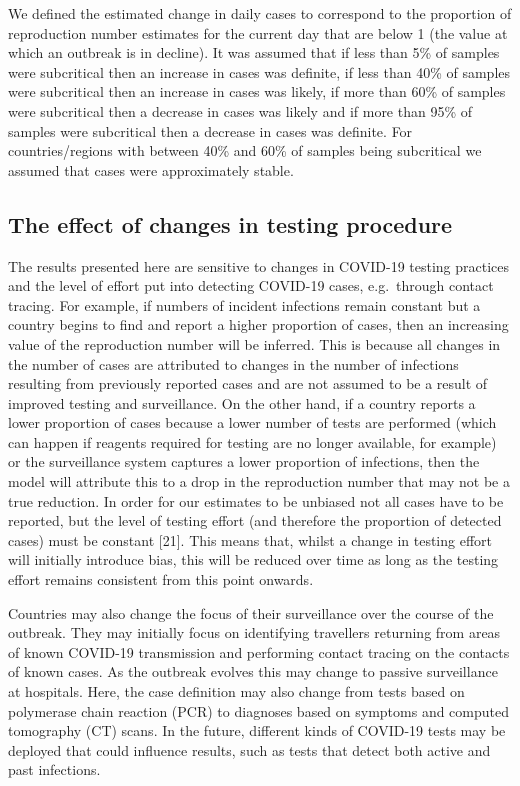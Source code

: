 \documentclass[
]{article}
\begin{document}
We defined the estimated change in daily cases to correspond to the
proportion of reproduction number estimates for the current day that are
below 1 (the value at which an outbreak is in decline). It was assumed
that if less than 5\% of samples were subcritical then an increase in
cases was definite, if less than 40\% of samples were subcritical then
an increase in cases was likely, if more than 60\% of samples were
subcritical then a decrease in cases was likely and if more than 95\% of
samples were subcritical then a decrease in cases was definite. For
countries/regions with between 40\% and 60\% of samples being
subcritical we assumed that cases were approximately stable.

\hypertarget{the-effect-of-changes-in-testing-procedure}{%
\subsection{The effect of changes in testing
procedure}\label{the-effect-of-changes-in-testing-procedure}}

The results presented here are sensitive to changes in COVID-19 testing
practices and the level of effort put into detecting COVID-19 cases,
e.g.~through contact tracing. For example, if numbers of incident
infections remain constant but a country begins to find and report a
higher proportion of cases, then an increasing value of the reproduction
number will be inferred. This is because all changes in the number of
cases are attributed to changes in the number of infections resulting
from previously reported cases and are not assumed to be a result of
improved testing and surveillance. On the other hand, if a country
reports a lower proportion of cases because a lower number of tests are
performed (which can happen if reagents required for testing are no
longer available, for example) or the surveillance system captures a
lower proportion of infections, then the model will attribute this to a
drop in the reproduction number that may not be a true reduction. In
order for our estimates to be unbiased not all cases have to be
reported, but the level of testing effort (and therefore the proportion
of detected cases) must be constant {[}21{]}. This means that, whilst a
change in testing effort will initially introduce bias, this will be
reduced over time as long as the testing effort remains consistent from
this point onwards.

Countries may also change the focus of their surveillance over the
course of the outbreak. They may initially focus on identifying
travellers returning from areas of known COVID-19 transmission and
performing contact tracing on the contacts of known cases. As the
outbreak evolves this may change to passive surveillance at hospitals.
Here, the case definition may also change from tests based on polymerase
chain reaction (PCR) to diagnoses based on symptoms and computed
tomography (CT) scans. In the future, different kinds of COVID-19 tests
may be deployed that could influence results, such as tests that detect
both active and past infections.
\end{document}
